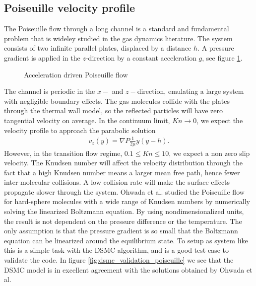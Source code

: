 \subsection{Poiseuille velocity profile}
\label{sec:dsmc_validation_poiseuille}
The Poiseuille flow through a long channel is a standard and fundamental problem that is wideley studied in the gas dynamics literature. The system consists of two infinite parallel plates, displaced by a distance $h$. A pressure gradient is applied in the $z$-direction by a constant acceleration $g$, see figure \ref{fig:dsmc_validation_poiseuille_system}. 

\begin{figure}[htp]
\centering
\label{fig:dsmc_validation_poiseuille_system}
\caption{Acceleration driven Poiseuille flow}
\end{figure}
The channel is periodic in the $x-$ and $z-$direction, emulating a large system with negligible boundary effects. The gas molecules collide with the plates through the thermal wall model, so the reflected particles will have zero tangential velocity on average. In the continuum limit, $Kn\rightarrow 0$, we expect the velocity profile to approach the parabolic solution \cite{batchelor2000introduction}
\begin{align}
	v_z(y) = \nabla P\frac{1}{2\mu}y(y-h).
\end{align}
However, in the transition flow regime, $0.1 \leq Kn \leq 10$, we expect a non zero slip velocity\cite{morris1992slip}. The Knudsen number will affect the velocity distribution through the fact that a high Knudsen number means a larger mean free path, hence fewer inter-molecular collisions. A low collision rate will make the surface effects propagate slower through the system. Ohwada et al. \cite{ohwada1989numerical} studied the Poiseuille flow for hard-sphere molecules with a wide range of Knudsen numbers by numerically solving the linearized Boltzmann equation. By using nondimensionalized units, the result is not dependent on the pressure difference or the temperature. The only assumption is that the pressure gradient is so small that the Boltzmann equation can be linearized around the equilibrium state. To setup as system like this is a simple task with the DSMC algorithm, and is a good test case to validate the code. In figure \ref{fig:dsmc_validation_poiseuille} we see that the DSMC model is in excellent agreement with the solutions obtained by Ohwada et al.
